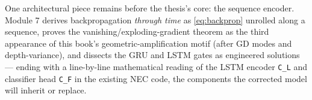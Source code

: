 \documentclass[11pt]{article}
\numberwithin{equation}{section}
\theoremstyle{plain}
\theoremstyle{definition}
\theoremstyle{remark}
\begin{document}
\medskip
One architectural piece remains before the thesis's core: the sequence encoder. Module 7 derives backpropagation \emph{through time} as \eqref{eq:backprop} unrolled along a sequence, proves the vanishing/exploding-gradient theorem as the third appearance of this book's geometric-amplification motif (after GD modes and depth-variance), and dissects the GRU and LSTM gates as engineered solutions --- ending with a line-by-line mathematical reading of the LSTM encoder \texttt{C\_L} and classifier head \texttt{C\_F} in the existing NEC code, the components the corrected model will inherit or replace.
\end{document}
